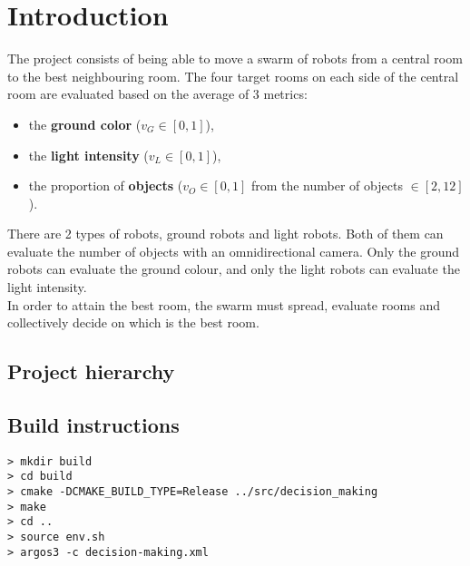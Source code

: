 \section{Introduction}

The project consists of being able to move a swarm of robots from a central room
to the best neighbouring room. The four target rooms on each side of the central
room are evaluated based on the average of 3 metrics:

\begin{itemize}
    \item the \textbf{ground color} ($v_G \in [0,1]$),
    \item the \textbf{light intensity} ($v_L \in [0,1]$),
    \item the proportion of \textbf{objects} ($v_O \in [0,1]$ from the number
    of objects
$\in [2,12]$).
\end{itemize}

\noindent There are 2 types of robots, ground robots and light robots. Both of
them can evaluate the number of objects with an omnidirectional camera. Only the
ground robots can evaluate the ground colour, and only the light robots can
evaluate the light intensity.\\

\noindent In order to attain the best room, the swarm must spread, evaluate rooms and
collectively decide on which is the best room.

\subsection{Project hierarchy}

\begin{framed}
\end{framed}

\subsection {Build instructions}

\begin{lstlisting}
> mkdir build
> cd build
> cmake -DCMAKE_BUILD_TYPE=Release ../src/decision_making
> make
> cd ..
> source env.sh
> argos3 -c decision-making.xml
\end{lstlisting}

\newpage
